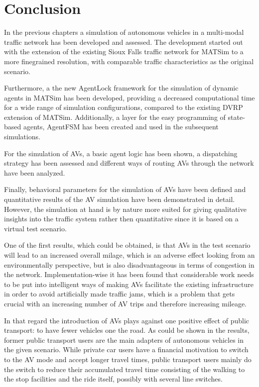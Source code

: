 \section{Conclusion}
\label{sec:conclusion}

In the previous chapters a simulation of autonomous vehicles in a multi-modal
traffic network has been developed and assessed. The development started out
with the extension of the existing Sioux Falls traffic network for MATSim to
a more finegrained resolution, with comparable traffic characteristics as the
original scenario.

Furthermore, a the new AgentLock framework for the simulation of dynamic agents in MATSim has
been developed, providing a decreased computational time for a wide range of
simulation configurations, compared to the existing DVRP extension of MATSim.
Additionally, a layer for the easy programming of state-based agents, AgentFSM has
been created and used in the subsequent simulations.

For the simulation of AVs, a basic agent logic has been shown, a dispatching
strategy has been assessed and different ways of routing AVs through the network
have been analyzed.

Finally, behavioral parameters for the simulation of AVs have been defined and
quantitative results of the AV simulation have been
demonstrated in detail. However, the simulation at hand is by nature more suited
for giving qualitative insights into the traffic system rather then quantitative
since it is based on a virtual test scenario.

One of the first results, which could be obtained, is that AVs in the test
scenario will lead to an increased overall milage, which is an adverse effect
looking from an environmentally perspective, but is also disadvantageous in
terms of congestion in the network. Implementation-wise it has been found that
considerable work needs to be put into intelligent ways of making AVs facilitate
the existing infrastructure in order to avoid artificially made traffic jams,
which is a problem that gets crucial with an increasing number of AV trips
and therefore increasing mileage.

In that regard the introduction of AVs plays against one positive effect of
public transport: to have fewer vehicles one the road. As could be shown in the
results, former public transport users are the main adapters of autonomous vehicles
in the given scenario. While private car users have a financial motivation to switch
to the AV mode and accept longer travel times, public transport users mainly do
the switch to reduce their accumulated travel time consisting of the walking
to the stop facilities and the ride itself, possibly with several line switches.

